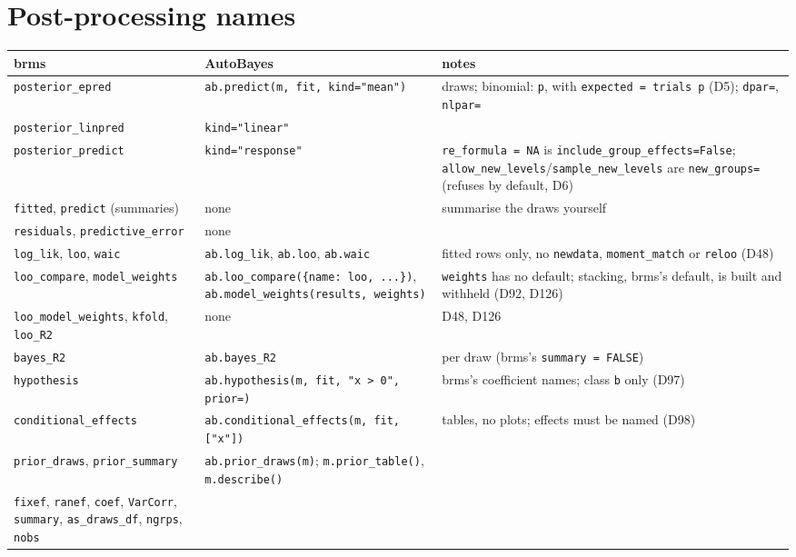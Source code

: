\documentclass[11pt]{article}
\newcommand{\code}[1]{\texttt{#1}}
\begin{document}
\section{Post-processing names}\label{sec:post}

\begin{table}[tbp]
\footnotesize
\begin{center}\begin{tabular}{@{}L{0.24\textwidth}L{0.34\textwidth}L{0.36\textwidth}@{}}
\toprule
brms & AutoBayes & notes \\
\midrule
\code{posterior\_epred} & \code{ab.predict(m, fit, kind="mean")} & draws; binomial: \code{p}, with \code{expected = trials p}
(D5); \code{dpar=}, \code{nlpar=} \\
\code{posterior\_linpred} & \code{kind="linear"} & \\
\code{posterior\_predict} & \code{kind="response"} & \code{re\_formula = NA} is \code{include\_group\_effects=False};
\code{allow\_new\_levels}/\code{sample\_new\_levels} are \code{new\_groups=} (refuses by default, D6) \\
\code{fitted}, \code{predict} (summaries) & none & summarise the draws yourself \\
\code{residuals}, \code{predictive\_error} & none & \\
\code{log\_lik}, \code{loo}, \code{waic} & \code{ab.log\_lik}, \code{ab.loo}, \code{ab.waic} & fitted rows only, no
\code{newdata}, \code{moment\_match} or \code{reloo} (D48) \\
\code{loo\_compare}, \code{model\_weights} & \code{ab.loo\_compare(\{name: loo, ...\})}, \code{ab.model\_weights(results,
weights)} & \code{weights} has no default; stacking, brms's default, is built and withheld (D92, D126) \\
\code{loo\_model\_weights}, \code{kfold}, \code{loo\_R2} & none & D48, D126 \\
\code{bayes\_R2} & \code{ab.bayes\_R2} & per draw (brms's \code{summary = FALSE}) \\
\code{hypothesis} & \code{ab.hypothesis(m, fit, "x > 0", prior=)} & brms's coefficient names; class \code{b} only (D97) \\
\code{conditional\_effects} & \code{ab.conditional\_effects(m, fit, ["x"])} & tables, no plots; effects must be named
(D98) \\
\code{prior\_draws}, \code{prior\_summary} & \code{ab.prior\_draws(m)}; \code{m.prior\_table()}, \code{m.describe()} &
\\
\code{fixef}, \code{ranef}, \code{coef}, \code{VarCorr}, \code{summary}, \code{as\_draws\_df}, \code{ngrps}, \code{nobs} &

\end{tabular}
\end{center}
\end{table}
\end{document}
